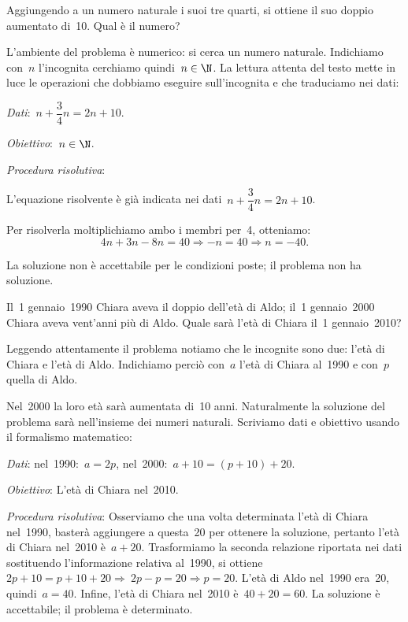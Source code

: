 
\begin{problema}{}{}
Aggiungendo a un numero naturale i suoi tre quarti, si ottiene il suo
doppio aumentato di~10. Qual è il numero?
\end{problema}

L'ambiente del problema è numerico: si cerca un numero
naturale. Indichiamo con~\(n\) l'incognita
cerchiamo quindi~\(n\in\N\). La lettura attenta del testo mette
in luce le operazioni che dobbiamo eseguire
sull'incognita e che traduciamo nei dati:

\emph{Dati}:~\(n+\dfrac{3}{4}n=2n+10\).

\emph{Obiettivo}:~\(n\in\N\).

\emph{Procedura risolutiva}:

L'equazione risolvente è già indicata nei dati~\(n+\dfrac{3}{4}n=2n+10\).

Per risolverla moltiplichiamo ambo i membri per~4, otteniamo:
\[4n+3n-8n=40\Rightarrow -n=40\Rightarrow n=-40.\]

La soluzione non è accettabile per le condizioni poste; il problema
non ha soluzione.

\begin{problema}{}{}
 Il~1{\textdegree} gennaio~1990 Chiara aveva il doppio
dell'età di Aldo; il~1{\textdegree} gennaio~2000
Chiara aveva vent'anni più di Aldo. Quale sarà
l'età di Chiara il~1{\textdegree} gennaio~2010?
\end{problema}

Leggendo attentamente il problema notiamo che le incognite sono due:
l'età di Chiara e l'età di Aldo.
Indichiamo perciò con~\(a\) l'età di
Chiara al~1990 e con~\(p\) quella di Aldo.

Nel~2000 la loro età sarà aumentata di~10 anni. Naturalmente la
soluzione del problema sarà nell'insieme dei numeri
naturali. Scriviamo dati e obiettivo usando il formalismo matematico:

\emph{Dati}: nel~1990:~\(a=2p\), nel~2000:~\(a+10=(p+10)+20\).

\emph{Obiettivo}: L'età di Chiara nel~2010.

\emph{Procedura risolutiva}:
Osserviamo che una volta determinata l'età di Chiara
nel~1990, basterà aggiungere a questa~20 per ottenere la soluzione,
pertanto l'età di Chiara nel~2010 è~\(a+20\).
Trasformiamo la seconda relazione riportata nei dati sostituendo
l'informazione relativa al~1990,
si ottiene~\(2p+10=p+10+20\Rightarrow~2p-p=20\Rightarrow p=20.\)
L'età di Aldo nel~1990 era~20, quindi~\(a=40\).
Infine, l'età di Chiara nel~2010 è~\(40+20=60\).
La soluzione è accettabile; il problema è determinato.


